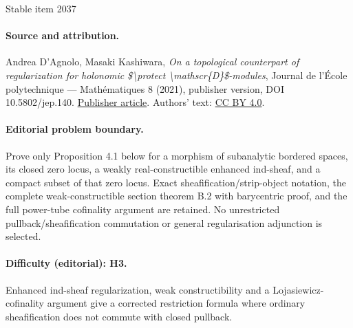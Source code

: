 \documentclass[11pt]{article}
\numberwithin{equation}{section}
\begin{document}
\begin{center}{\Large Stable item 2037}\end{center}
\paragraph{Source and attribution.}
Andrea D’Agnolo, Masaki Kashiwara, \emph{On a topological counterpart of regularization for holonomic \$\textbackslash{}protect \textbackslash{}mathscr\{D\}\$-modules}, Journal de l’École polytechnique — Mathématiques 8 (2021), publisher version, DOI 10.5802/jep.140. \href{https://jep.centre-mersenne.org/articles/10.5802/jep.140/}{Publisher article}. Authors' text: \href{https://creativecommons.org/licenses/by/4.0/}{CC BY 4.0}.
\paragraph{Editorial problem boundary.}
Prove only Proposition 4.1 below for a morphism of subanalytic bordered spaces, its closed zero locus, a weakly real-constructible enhanced ind-sheaf, and a compact subset of that zero locus. Exact sheafification/strip-object notation, the complete weak-constructible section theorem B.2 with barycentric proof, and the full power-tube cofinality argument are retained. No unrestricted pullback/sheafification commutation or general regularisation adjunction is selected.
\paragraph{Difficulty (editorial): H3.}
Enhanced ind-sheaf regularization, weak constructibility and a Lojasiewicz-cofinality argument give a corrected restriction formula where ordinary sheafification does not commute with closed pullback.
\end{document}
